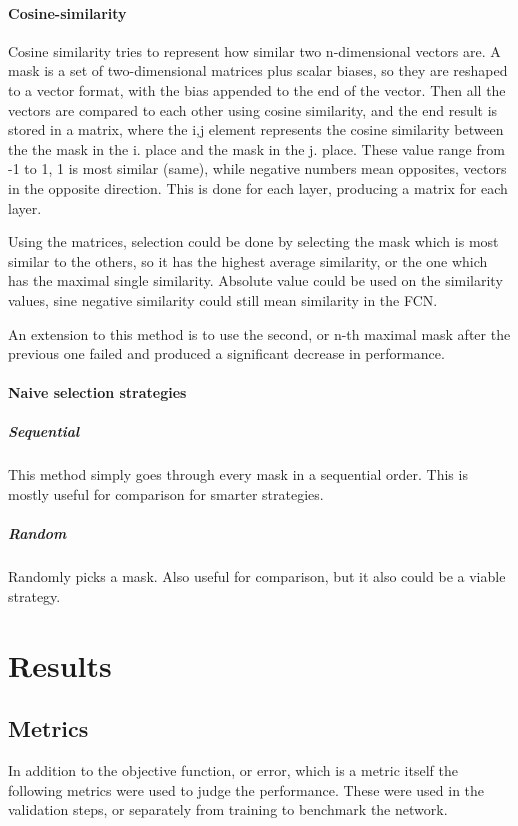 \documentclass[12pt]{report}
\begin{document}
\subsubsection{Cosine-similarity}Cosine similarity  tries to represent how similar two n-dimensional vectors are. A mask is a set of two-dimensional matrices plus scalar biases, so they are reshaped to a vector format, with the bias appended to the end of the vector. Then all the vectors are compared to each other using cosine similarity, and the end result is stored in a matrix, where the i,j element represents the cosine similarity between the the mask in the i. place and the mask in the j. place. These value range from -1 to 1, 1 is most similar (same), while negative numbers mean opposites, vectors in the opposite direction. This is done for each layer, producing a matrix for each layer.\par

Using the matrices, selection could be done by selecting the mask which is most similar to the others, so it has the highest average similarity, or the one which has the maximal single similarity. Absolute value could be used on the similarity values, sine negative similarity could still mean similarity in the FCN.\par

An extension to this method is to use the second, or n-th maximal mask after the previous one failed and produced a significant decrease in performance.
\subsubsection{Naive selection strategies}
\paragraph{Sequential}This method simply goes through every mask in a sequential order. This is mostly useful for comparison for smarter strategies.
\paragraph{Random}
Randomly picks a mask. Also useful for comparison, but it also could be a viable strategy.
\chapter{Results}
\section{Metrics}
In addition to the objective function, or error, which is a metric itself the following metrics were used to judge the performance. These were used in the validation steps, or separately from training to benchmark the network.
\end{document}
